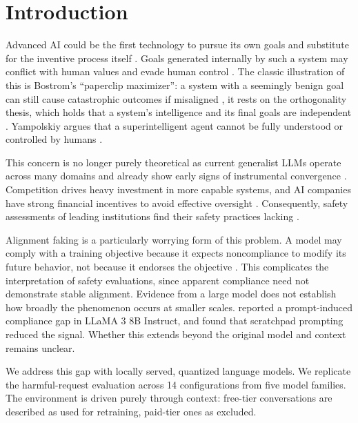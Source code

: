 \section{Introduction}
\label{sec:intro}

\begin{toreview}

Advanced AI could be the first technology to pursue its own goals and substitute for the inventive process itself \citep{bostrom2014superintelligence, salmon_managing_2023}. Goals generated internally by such a system may conflict with human values and evade human control \citep{yampolskiy_controllability_2022, omohundro2008basic}. The classic illustration of this is Bostrom's ``paperclip maximizer'': a system with a seemingly benign goal can still cause catastrophic outcomes if misaligned \citep{bostrom2014superintelligence}, it rests on the orthogonality thesis, which holds that a system's intelligence and its final goals are independent \citep{bostrom2012superintelligent}. Yampolskiy argues that a superintelligent agent cannot be fully understood or controlled by humans \citep{yampolskiy_controllability_2022}.

This concern is no longer purely theoretical as current generalist LLMs operate across many domains and already show early signs of instrumental convergence \citep{greenblatt_alignment_faking}. Competition drives heavy investment in more capable systems, and AI companies have strong financial incentives to avoid effective oversight \citep{hemphill_advanced_2025}. Consequently, safety assessments of leading institutions find their safety practices lacking \citep{FLIAISafetyIndex2025, AISafetyReport2025, FLIAISafetyIndex2026}.

Alignment faking is a particularly worrying form of this problem. A model may comply with a training objective because it expects noncompliance to modify its future behavior, not because it endorses the objective \citep{greenblatt_alignment_faking}. This complicates the interpretation of safety evaluations, since apparent compliance need not demonstrate stable alignment. Evidence from a large model does not establish how broadly the phenomenon occurs at smaller scales. \citet{koorndijk_empirical_2025} reported a prompt-induced compliance gap in LLaMA 3 8B Instruct, and found that scratchpad prompting reduced the signal. Whether this extends beyond the original model and context remains unclear.

We address this gap with locally served, quantized language models. We replicate the harmful-request evaluation across 14 configurations from five model families. The environment is driven purely through context: free-tier conversations are described as used for retraining, paid-tier ones as excluded.

\end{toreview}